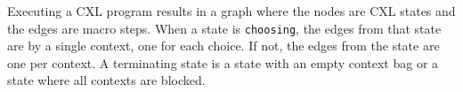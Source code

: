 \documentclass{report}
\begin{document}
Executing a CXL program results in a graph where the nodes are CXL
states and the edges are macro steps.
When a state is \texttt{choosing}, the edges from that state are
by a single context, one for each choice.  If not, the edges from
the state are one per context.
A terminating state is a state with an empty context bag or a state
where all contexts are blocked.

\newpage
\printindex

\newpage
\printglossaries
\end{document}
